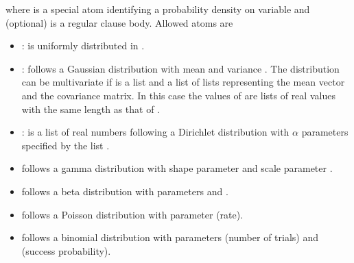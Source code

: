 \documentclass[letterpaper,10pt,english]{sphinxmanual}
\begin{document}
where  is a special atom identifying a probability density on variable  and 
(optional) is a regular clause body. Allowed  atoms are
\begin{itemize}
\item {} 
:  is uniformly distributed in \sphinxcode{\sphinxupquote{{[}L,U{]}}}.

\item {} 
:  follows a Gaussian distribution with mean  and variance . The distribution can be multivariate if  is a list and  a list of lists representing the mean vector and the covariance matrix. In this case the values of  are lists of real values with the same length as that of .

\item {} 
:  is a list of real numbers following a Dirichlet distribution with \(\alpha\) parameters specified by the list .

\item {} 
  follows a gamma distribution with shape parameter  and scale parameter .

\item {} 
  follows a beta distribution with parameters  and .

\item {} 
  follows a Poisson distribution with parameter  (rate).

\item {} 
  follows a binomial distribution with parameters  (number of trials) and  (success probability).


\end{itemize}
\end{document}
